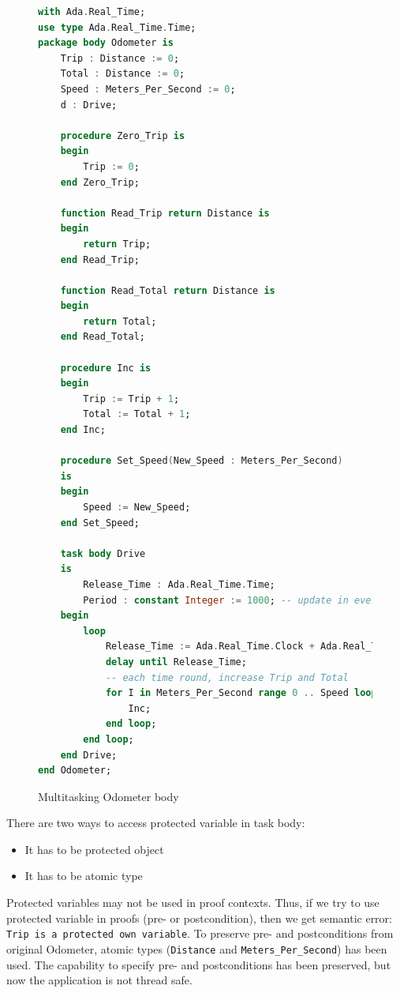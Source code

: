 \begin{figure}%
\singlespacing
\begin{lstlisting}[language=ada, frame=single, gobble=0]
with Ada.Real_Time;
use type Ada.Real_Time.Time;
package body Odometer is
    Trip : Distance := 0;
    Total : Distance := 0;
    Speed : Meters_Per_Second := 0;
    d : Drive;
    
    procedure Zero_Trip is
    begin
        Trip := 0;
    end Zero_Trip;
    
    function Read_Trip return Distance is
    begin
        return Trip;
    end Read_Trip;
    
    function Read_Total return Distance is
    begin
        return Total;
    end Read_Total;
    
    procedure Inc is
    begin
        Trip := Trip + 1;
        Total := Total + 1;
    end Inc;
    
    procedure Set_Speed(New_Speed : Meters_Per_Second)
    is
    begin
        Speed := New_Speed;
    end Set_Speed;    
    
    task body Drive
    is
        Release_Time : Ada.Real_Time.Time;
        Period : constant Integer := 1000; -- update in every second
    begin
        loop
            Release_Time := Ada.Real_Time.Clock + Ada.Real_Time.Milliseconds(Period);
            delay until Release_Time;
            -- each time round, increase Trip and Total
            for I in Meters_Per_Second range 0 .. Speed loop
                Inc;
            end loop;            
        end loop;
    end Drive;
end Odometer;
\end{lstlisting} 
\doublespacing
\caption{Multitasking Odometer body}
\label{listing:Odometer2005Tasking_body}
\end{figure}

There are two ways to access protected variable in task body:
\begin{itemize}
    \item It has to be protected object
    \item It has to be atomic type
\end{itemize}

Protected variables may not be used in proof contexts. Thus, if we try to use protected variable in proofs (pre- or postcondition), then we get semantic error: \lstinline{Trip is a protected own variable}. To preserve pre- and postconditions from original Odometer, atomic types (\lstinline{Distance} and \lstinline{Meters_Per_Second}) has been used. The capability to specify pre- and postconditions has been preserved, but now the application is not thread safe.


